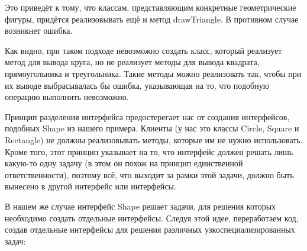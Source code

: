 \documentclass[a4paper]{article}
\begin{document}
\begin{figure}[h]
\end{figure}


Это приведёт к тому, что классам, представляющим конкретные геометрические фигуры, придётся реализовывать ещё и метод drawTriangle. В противном случае возникнет ошибка.

Как видно, при таком подходе невозможно создать класс, который реализует метод для вывода круга, но не реализует методы для вывода квадрата, прямоугольника и треугольника. Такие методы можно реализовать так, чтобы при их выводе выбрасывалась бы ошибка, указывающая на то, что подобную операцию выполнить невозможно.

Принцип разделения интерфейса предостерегает нас от создания интерфейсов, подобных Shape из нашего примера. Клиенты (у нас это классы Circle, Square и Rectangle) не должны реализовывать методы, которые им не нужно использовать. Кроме того, этот принцип указывает на то, что интерфейс должен решать лишь какую-то одну задачу (в этом он похож на принцип единственной ответственности), поэтому всё, что выходит за рамки этой задачи, должно быть вынесено в другой интерфейс или интерфейсы.


\newpage
В нашем же случае интерфейс Shape решает задачи, для решения которых необходимо создать отдельные интерфейсы. Следуя этой идее, переработаем код, создав отдельные интерфейсы для решения различных узкоспециализированных задач:
\end{document}
